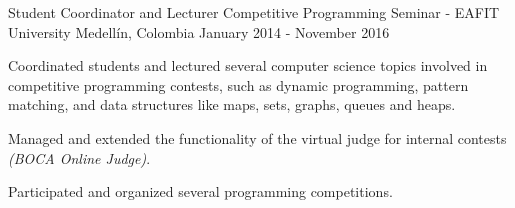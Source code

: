\begin{cventries}
  \cventry
    {Student Coordinator and Lecturer}
    {Competitive Programming Seminar - EAFIT University}
    {Medellín, Colombia}
    {January 2014 - November 2016}
    {
      \begin{cvitems}
        \item {Coordinated students and lectured several computer science topics involved in competitive programming contests, such as dynamic programming, pattern matching, and data structures like maps, sets, graphs, queues and heaps.}
        \item {Managed and extended the functionality of the virtual judge for internal contests \textit{(BOCA Online Judge)}.}
        \item {Participated and organized several programming competitions.}
      \end{cvitems}
    }
\end{cventries}
